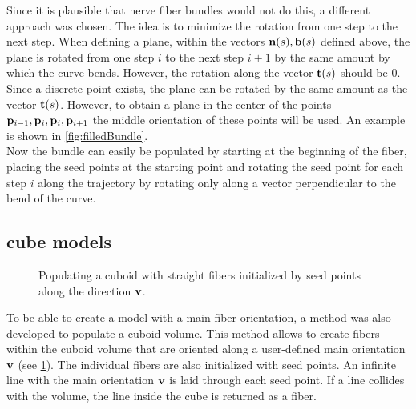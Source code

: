 % 
Since it is plausible that nerve fiber bundles would not do this, a different approach was chosen.
The idea is to minimize the rotation from one step to the next step.
When defining a plane, within the vectors $\mathbf{n}(s),\mathbf{b}(s)$ defined above, the plane is rotated from one step $i$ to the next step $i+1$ by the same amount by which the curve bends.
However, the rotation along the vector $\mathbf{t}(s)$ should be $0$.
Since a discrete point exists, the plane can be rotated by the same amount as the vector $\mathbf{t}(s)$.
However, to obtain a plane in the center of the points $\mathbf{p}_{i-1}, \mathbf{p}_{i}, \mathbf{p}_{i}, \mathbf{p}_{i+1}$ the middle orientation of these points will be used.
An example is shown in \cref{fig:filledBundle}.
\\
% 
Now the bundle can easily be populated by starting at the beginning of the fiber, placing the seed points at the starting point and rotating the seed point for each step $i$ along the trajectory by rotating only along a vector perpendicular to the bend of the curve.
% 
\subsection{cube models}
% 
\begin{figure}[!t]
    \centering
    \setlength{\tikzwidth}{0.5\textwidth}
	\caption{Populating a cuboid with straight fibers initialized by seed points along the direction $\mathbf{v}$.}
    \label{fig:cubeBuild}%
\end{figure}
% 
To be able to create a model with a main fiber orientation, a method was also developed to populate a cuboid volume.
This method allows to create fibers within the cuboid volume that are oriented along a user-defined main orientation $\mathbf{v}$ (see \cref{fig:cubeBuild}). 
The individual fibers are also initialized with seed points.
An infinite line with the main orientation $\mathbf{v}$ is laid through each seed point.
If a line collides with the volume, the line inside the cube is returned as a fiber.
% 
